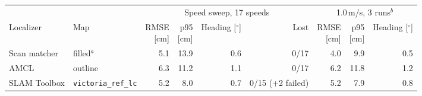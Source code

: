 \begin{tabular}{llrrrrrrr}
\toprule
 & & \multicolumn{4}{c}{Speed sweep, 17 speeds} & \multicolumn{3}{c}{1.0\,m/s, 3 runs${}^{b}$} \\
\cmidrule(lr){3-6}\cmidrule(lr){7-9}
Localizer & Map & \makecell[rb]{{RMSE} \\ {[cm]}} & \makecell[rb]{{p95} \\ {[cm]}} & \makecell[rb]{{Heading} \\ {[$^\circ$]}} & Lost & \makecell[rb]{{RMSE} \\ {[cm]}} & \makecell[rb]{{p95} \\ {[cm]}} & \makecell[rb]{{Heading} \\ {[$^\circ$]}} \\
\midrule
Scan matcher & filled${}^{a}$ & 5.1 & 13.9 & 0.6 & 0/17 & 4.0 & 9.9 & 0.5 \\
AMCL & outline & 6.3 & 11.2 & 1.1 & 0/17 & 6.2 & 11.8 & 1.2 \\
SLAM Toolbox & \texttt{victoria\_ref\_lc} & 5.2 & 8.0 & 0.7 & 0/15 (+2 failed) & 5.2 & 7.9 & 0.8 \\
\bottomrule
\end{tabular}
